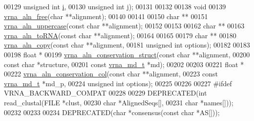 \begin{DoxyCode}
00129                \textcolor{keywordtype}{unsigned} \textcolor{keywordtype}{int} \hyperlink{group__aln__utils_ab91db0a87ef8402dc151795ba5a64c6f}{i},
00130                \textcolor{keywordtype}{unsigned} \textcolor{keywordtype}{int} \hyperlink{group__aln__utils_a4142e38d6ba127acccdf680300a88e1f}{j});
00131 
00132 
00138 \textcolor{keywordtype}{void}
00139 \hyperlink{group__aln__utils_gac00dc80b8a324f151f92f11ab6850ecf}{vrna\_aln\_free}(\textcolor{keywordtype}{char} **alignment);
00140 
00141 
00150 \textcolor{keywordtype}{char} **
00151 \hyperlink{group__aln__utils_ga3a0476a71c4bae3d302790de58055704}{vrna\_aln\_uppercase}(\textcolor{keyword}{const} \textcolor{keywordtype}{char} **alignment);
00152 
00153 
00162 \textcolor{keywordtype}{char} **
00163 \hyperlink{group__aln__utils_ga7886fc678553c06472a712a335cde9cf}{vrna\_aln\_toRNA}(\textcolor{keyword}{const} \textcolor{keywordtype}{char} **alignment);
00164 
00165 
00179 \textcolor{keywordtype}{char} **
00180 \hyperlink{group__aln__utils_ga08cdca592461436860daf9738279ce17}{vrna\_aln\_copy}(\textcolor{keyword}{const} \textcolor{keywordtype}{char}    **alignment,
00181               \textcolor{keywordtype}{unsigned} \textcolor{keywordtype}{int}  options);
00182 
00183 
00198 \textcolor{keywordtype}{float} *
00199 \hyperlink{group__aln__utils_gab6f16a2ea93f3bfd4d089cc8d448bb16}{vrna\_aln\_conservation\_struct}(\textcolor{keyword}{const} \textcolor{keywordtype}{char}       **alignment,
00200                              \textcolor{keyword}{const} \textcolor{keywordtype}{char}       *structure,
00201                              \textcolor{keyword}{const} \hyperlink{group__model__details_structvrna__md__s}{vrna\_md\_t}  *md);
00202 
00203 
00221 \textcolor{keywordtype}{float} *
00222 \hyperlink{group__aln__utils_gaa12b481a7e7b965ef2eb1bcc4399e759}{vrna\_aln\_conservation\_col}(\textcolor{keyword}{const} \textcolor{keywordtype}{char}      **alignment,
00223                           \textcolor{keyword}{const} \hyperlink{group__model__details_structvrna__md__s}{vrna\_md\_t} *md\_p,
00224                           \textcolor{keywordtype}{unsigned} \textcolor{keywordtype}{int}    options);
00225 
00226 
00227 \textcolor{preprocessor}{#ifdef VRNA\_BACKWARD\_COMPAT}
00228 
00229 DEPRECATED(\textcolor{keywordtype}{int} read\_clustal(FILE  *clust,
00230                             \textcolor{keywordtype}{char}  *AlignedSeqs[],
00231                             \textcolor{keywordtype}{char}  *names[]));
00232 
00233 
00234 DEPRECATED(\textcolor{keywordtype}{char} *consensus(\textcolor{keyword}{const} \textcolor{keywordtype}{char} *AS[]));

\end{DoxyCode}
